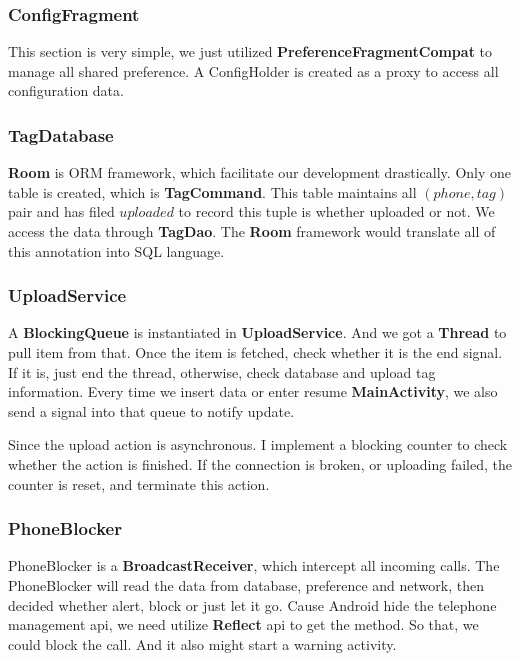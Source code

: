 \documentclass{article}
\begin{document}
    \subsubsection{ConfigFragment}
    This section is very simple, we just utilized \textbf{PreferenceFragmentCompat} to manage all shared preference.
    A ConfigHolder is created as a proxy to access all configuration data.

    \subsubsection{TagDatabase}
    \textbf{Room} \cite{room} is ORM framework, which facilitate our development drastically.
    Only one table is created, which is \textbf{TagCommand}.
    This table maintains all $(phone, tag)$ pair and has filed $uploaded$ to record this tuple is whether uploaded or not.
    We access the data through \textbf{TagDao}.
    The \textbf{Room} framework would translate all of this annotation into SQL language.

    \subsubsection{UploadService}
    A \textbf{BlockingQueue} is instantiated in \textbf{UploadService}.
    And we got a \textbf{Thread} to pull item from that.
    Once the item is fetched, check whether it is the end signal.
    If it is, just end the thread, otherwise, check database and upload tag information.
    Every time we insert data or enter resume \textbf{MainActivity}, we also send a signal into that queue to notify update.

    Since the upload action is asynchronous.
    I implement a blocking counter to check whether the action is finished.
    If the connection is broken, or uploading failed, the counter is reset, and terminate this action.

    \subsubsection{PhoneBlocker}
    PhoneBlocker is a \textbf{BroadcastReceiver}, which intercept all incoming calls.
    The PhoneBlocker will read the data from database, preference and network, then decided whether alert, block or just let it go.
    Cause Android hide the telephone management api, we need utilize \textbf{Reflect} api to get the method.
    So that, we could block the call.
    And it also might start a warning activity.
\end{document}
